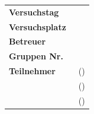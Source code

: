 \begin{tabular}{l l}

	{\textbf{Versuchstag}} \hspace{1cm} & \hspace{1cm} {\datum}\\[0,2cm]
	{\textbf{Versuchsplatz}} \hspace{1cm} & \hspace{1cm} {\platz}\\[0,2cm]
	{\textbf{Betreuer}} \hspace{1cm} & \hspace{1cm} {\betreuer}\\[1,2cm]
	{\textbf{Gruppen Nr.}} \hspace{1cm} & \hspace{1cm} {\groupnr}\\[0.2cm]
	{\textbf{Teilnehmer}} \hspace{1cm} & \hspace{1cm} {\teilnehmerm~(\emailm)}\\[0.2cm]
						  \hspace{1cm} & \hspace{1cm} {\teilnehmerp~(\emailp)}\\[0.2cm]
						  \hspace{1cm} & \hspace{1cm} {\teilnehmert~(\emailt)}\\[0.2cm]

\end{tabular}